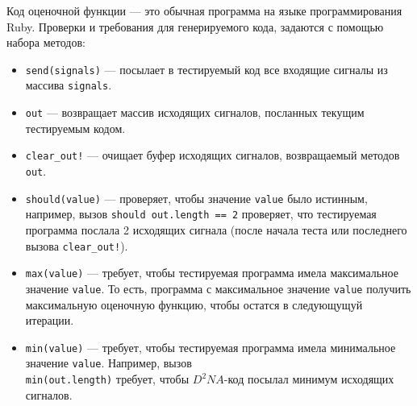 \documentclass[utf8,a5paper,portrait,10pt,twoside]{eskdtext}
\begin{document}
Код оценочной функции — это обычная программа на языке программирования Ruby.
Проверки и требования для генерируемого кода, задаются с помощью набора методов:
\begin{itemize}
  \item \texttt{send(signals)} — посылает в тестируемый код все входящие сигналы
        из массива \texttt{signals}.
  \item \texttt{out} — возвращает массив исходящих сигналов, посланных текущим
        тестируемым кодом.
  \item \texttt{clear\_out!} — очищает буфер исходящих сигналов, возвращаемый
        методов \texttt{out}.
  \item \texttt{should(value)} — проверяет, чтобы значение \texttt{value} было
        истинным, например, вызов \texttt{should out.length == 2} проверяет,
        что тестируемая программа послала 2 исходящих сигнала (после начала
        теста или последнего вызова \texttt{clear\_out!}).
  \item \texttt{max(value)} — требует, чтобы тестируемая программа имела
        максимальное значение \texttt{value}. То есть, программа с максимальное
        значение \texttt{value} получить максимальную оценочную функцию, чтобы
        остатся в следующущуй итерации.
  \item \texttt{min(value)} — требует, чтобы тестируемая программа имела
        минимальное значение \texttt{value}. Например, вызов\\
        \texttt{min(out.length)} требует, чтобы $D^2NA$-код посылал минимум
        исходящих сигналов.
\end{itemize}
\end{document}
